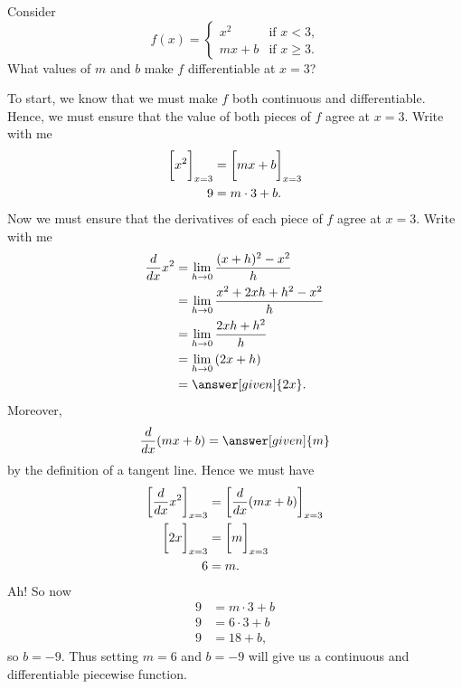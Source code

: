 \documentclass{ximera}
\begin{document}
\begin{example}
  Consider
  \[
  f(x) = \begin{cases}
          x^2 &\text{if $x<3$,}\\
          mx+b &\text{if $x\ge 3$.}
         \end{cases}
  \]
  What values of $m$ and $b$ make $f$ differentiable at $x=3$?
  \begin{explanation}
    To start, we know that we must make $f$ both continuous and
    differentiable. Hence, we must ensure that the value of both
    pieces of $f$ agree at $x=3$. Write with me
    \begin{align*}
      \bigg[ x^2 \bigg]_{x=3} &= \bigg[ mx+b \bigg]_{x=3}\\
      9 &= m\cdot 3 + b.
    \end{align*}
    Now we must ensure that the derivatives of each piece of $f$ agree
    at $x=3$. Write with me
    \begin{align*}
    \ddx x^2 &= \lim_{h\to 0}\frac{(x+h)^2-x^2}{h}\\
    &= \lim_{h\to 0}\frac{x^2 + 2xh + h^2 - x^2}{h}\\
    &= \lim_{h\to 0}\frac{2xh + h^2}{h}\\
    &= \lim_{h\to 0}\left(2x + h\right)\\
    &=\answer[given]{2x}.
    \end{align*}
    Moreover,
    \[
    \ddx(mx+ b) = \answer[given]{m}
    \]
    by the definition of a tangent line. Hence we must have
    \begin{align*}
      \bigg[ \frac{d}{\mathop{}\!d x} x^2 \bigg]_{x=3} &= \bigg[ \frac{d}{\mathop{}\!d x}(mx+b) \bigg]_{x=3}\\
      \bigg[ 2x \bigg]_{x=3} &= \bigg[ m \bigg]_{x=3}\\
      6 &= m.
    \end{align*}
    Ah! So now
    \begin{align*}
      9 &= m\cdot 3 + b\\
      9 &= 6\cdot 3 + b\\
      9 &= 18 + b,
    \end{align*}
    so $b=-9$. Thus setting $m=6$ and $b=-9$ will give us a continuous
    and differentiable piecewise function.
  \end{explanation}
\end{example}
\end{document}
